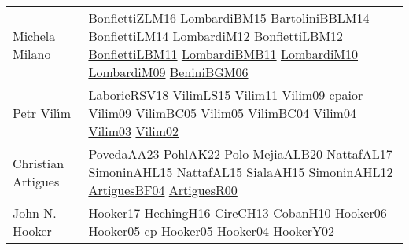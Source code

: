 {\begin{longtable}{p{4cm}p{20cm}}
Michela Milano & \href{papers/BonfiettiZLM16.pdf}{BonfiettiZLM16}\cite{BonfiettiZLM16} \href{papers/LombardiBM15.pdf}{LombardiBM15}\cite{LombardiBM15} \href{papers/BartoliniBBLM14.pdf}{BartoliniBBLM14}\cite{BartoliniBBLM14} \href{papers/BonfiettiLM14.pdf}{BonfiettiLM14}\cite{BonfiettiLM14} \href{articles/LombardiM12.pdf}{LombardiM12}\cite{LombardiM12} \href{papers/BonfiettiLBM12.pdf}{BonfiettiLBM12}\cite{BonfiettiLBM12} \href{papers/BonfiettiLBM11.pdf}{BonfiettiLBM11}\cite{BonfiettiLBM11} \href{papers/LombardiBMB11.pdf}{LombardiBMB11}\cite{LombardiBMB11} \href{papers/LombardiM10.pdf}{LombardiM10}\cite{LombardiM10} \href{papers/LombardiM09.pdf}{LombardiM09}\cite{LombardiM09} \href{papers/BeniniBGM06.pdf}{BeniniBGM06}\cite{BeniniBGM06} \\
Petr Vil{\'{\i}}m & \href{articles/LaborieRSV18.pdf}{LaborieRSV18}\cite{LaborieRSV18} \href{papers/VilimLS15.pdf}{VilimLS15}\cite{VilimLS15} \href{papers/Vilim11.pdf}{Vilim11}\cite{Vilim11} \href{papers/Vilim09.pdf}{Vilim09}\cite{Vilim09} \href{papers/cpaior-Vilim09.pdf}{cpaior-Vilim09}\cite{cpaior-Vilim09} \href{articles/VilimBC05.pdf}{VilimBC05}\cite{VilimBC05} \href{papers/Vilim05.pdf}{Vilim05}\cite{Vilim05} \href{papers/VilimBC04.pdf}{VilimBC04}\cite{VilimBC04} \href{papers/Vilim04.pdf}{Vilim04}\cite{Vilim04} \href{papers/Vilim03.pdf}{Vilim03}\cite{Vilim03} \href{papers/Vilim02.pdf}{Vilim02}\cite{Vilim02} \\
Christian Artigues & \href{papers/PovedaAA23.pdf}{PovedaAA23}\cite{PovedaAA23} \href{articles/PohlAK22.pdf}{PohlAK22}\cite{PohlAK22} \href{}{Polo-MejiaALB20}\cite{Polo-MejiaALB20} \href{articles/NattafAL17.pdf}{NattafAL17}\cite{NattafAL17} \href{articles/SimoninAHL15.pdf}{SimoninAHL15}\cite{SimoninAHL15} \href{articles/NattafAL15.pdf}{NattafAL15}\cite{NattafAL15} \href{papers/SialaAH15.pdf}{SialaAH15}\cite{SialaAH15} \href{papers/SimoninAHL12.pdf}{SimoninAHL12}\cite{SimoninAHL12} \href{papers/ArtiguesBF04.pdf}{ArtiguesBF04}\cite{ArtiguesBF04} \href{articles/ArtiguesR00.pdf}{ArtiguesR00}\cite{ArtiguesR00} \\
John N. Hooker & \href{papers/Hooker17.pdf}{Hooker17}\cite{Hooker17} \href{papers/HechingH16.pdf}{HechingH16}\cite{HechingH16} \href{papers/CireCH13.pdf}{CireCH13}\cite{CireCH13} \href{papers/CobanH10.pdf}{CobanH10}\cite{CobanH10} \href{articles/Hooker06.pdf}{Hooker06}\cite{Hooker06} \href{articles/Hooker05.pdf}{Hooker05}\cite{Hooker05} \href{papers/cp-Hooker05.pdf}{cp-Hooker05}\cite{cp-Hooker05} \href{papers/Hooker04.pdf}{Hooker04}\cite{Hooker04} \href{papers/HookerY02.pdf}{HookerY02}\cite{HookerY02} \\

\end{longtable}}
